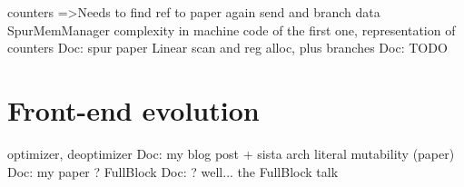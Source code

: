\documentclass[a4paper,12pt,twoside]{../includes/ThesisStyle}
\begin{document}
counters
=>Needs to find ref to paper again
send and branch data
SpurMemManager complexity in machine code of the first one, representation of counters
Doc: spur paper
Linear scan and reg alloc, plus branches
Doc: TODO

\section{Front-end evolution}

optimizer, deoptimizer 
Doc: my blog post + sista arch
literal mutability (paper)
Doc: my paper ?
FullBlock
Doc: ? well... the FullBlock talk


\ifx\wholebook\relax\else
    
\end{document}
